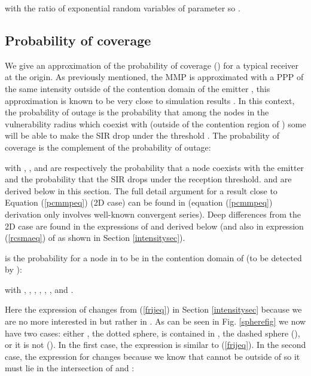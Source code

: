 \documentclass{sig-alternate-05-2015}
\begin{document}
with  the ratio of exponential random variables of parameter  so .

\subsection{Probability of coverage}

We give an approximation of the probability of coverage () for a typical receiver at the origin. As previously mentioned, the MMP is approximated with a PPP of the same intensity outside of the contention domain of the emitter , this approximation is known to be very close to simulation results \cite{haenggi11}. In this context, the probability of outage is the probability that among the nodes in the vulnerability radius which coexist with  (outside of the contention region of ) some will be able to make the SIR drop under the threshold . The probability of coverage is the complement of the probability of outage:



with , ,  and  are respectively the probability that a node coexists with the emitter and the probability that the SIR drops under the reception threshold.  and  are derived below in this section. The full detail argument for a result close to Equation (\ref{pcmmpeq}) (2D case) can be found in \cite{elsawy13} (equation (\ref{pcmmpeq}) derivation only involves well-known convergent series). Deep differences from the 2D case are found in the expressions of  and  derived below (and also in expression (\ref{rcsmaeq}) of  as shown in Section \ref{intensitysec}). 

 is the probability for a node in  to be in the contention domain of  (to be detected by ):



with
,
,
,
,
,
,
 and
.

Here the expression of  changes from (\ref{frijeq}) in Section \ref{intensitysec} because we are no more interested in  but rather in . As can be seen in Fig. \ref{spherefig} we now have two cases: either , the dotted sphere, is contained in , the dashed sphere (), or it is not (). In the first case, the expression is similar to (\ref{frijeq}). In the second case, the expression for  changes because we know that  cannot be outside of  so it must lie in the intersection of  and :



\begin{figure*}[ht]
        \centering
        \caption{Representation of the distances ,  in the vulnerability radius}
        \label{spherefig}
       
\end{figure*}
\end{document}
